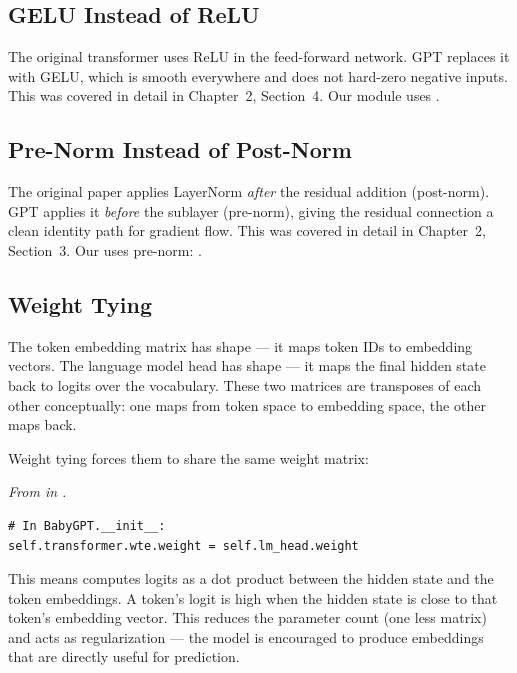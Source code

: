 \subsection{GELU Instead of ReLU}

The original transformer uses ReLU in the feed-forward network. GPT replaces it with GELU, which is smooth everywhere and does not hard-zero negative inputs. This was covered in detail in Chapter~2, Section~4. Our  module uses .

\subsection{Pre-Norm Instead of Post-Norm}

The original paper applies LayerNorm \emph{after} the residual addition (post-norm). GPT applies it \emph{before} the sublayer (pre-norm), giving the residual connection a clean identity path for gradient flow. This was covered in detail in Chapter~2, Section~3. Our  uses pre-norm: .

\subsection{Weight Tying}

The token embedding matrix  has shape  --- it maps token IDs to embedding vectors. The language model head  has shape  --- it maps the final hidden state back to logits over the vocabulary. These two matrices are transposes of each other conceptually: one maps from token space to embedding space, the other maps back.

Weight tying forces them to share the same weight matrix:

\concepttag
{\small\itshape From  in .}
\begin{lstlisting}
# In BabyGPT.__init__:
self.transformer.wte.weight = self.lm_head.weight
\end{lstlisting}

This means  computes logits as a dot product between the hidden state and the token embeddings. A token's logit is high when the hidden state is close to that token's embedding vector. This reduces the parameter count (one less  matrix) and acts as regularization --- the model is encouraged to produce embeddings that are directly useful for prediction.

